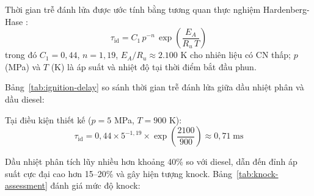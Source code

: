 \documentclass[../main.tex]{subfiles}
\begin{document}
Thời gian trễ đánh lửa được ước tính bằng tương quan thực nghiệm Hardenberg-Hase \cite{Heywood1988}:
\begin{equation}
  \tau_{\text{id}} = C_1 \, p^{-n} \, \exp\!\left(\frac{E_A}{R_u \, T}\right)
  \label{eq:ignition-delay}
\end{equation}
trong đó $C_1 = 0{,}44$, $n = 1{,}19$, $E_A/R_u \approx 2.100$ K cho nhiên liệu có CN thấp; $p$ (MPa) và $T$ (K) là áp suất và nhiệt độ tại thời điểm bắt đầu phun.

Bảng~\ref{tab:ignition-delay} so sánh thời gian trễ đánh lửa giữa dầu nhiệt phân và dầu diesel:
\begin{table}[htbp]
\centering
\caption{So sánh thời gian trễ đánh lửa $\tau_{\text{id}}$ giữa dầu nhiệt phân và dầu diesel}
\label{tab:ignition-delay}
\setlength{\tabcolsep}{4pt}
\end{table}

Tại điều kiện thiết kế ($p = 5$ MPa, $T = 900$ K):
\begin{equation}
  \tau_{\text{id}} = 0{,}44 \times 5^{-1,19} \times \exp\!\left(\frac{2100}{900}\right)
  \approx 0{,}71 \;\text{ms}
\end{equation}

Dầu nhiệt phân tích lũy nhiều hơn khoảng 40\% so với diesel, dẫn đến đỉnh áp suất cực đại cao hơn 15--20\% và gây hiện tượng knock. Bảng~\ref{tab:knock-assessment} đánh giá mức độ knock:
\begin{table}[htbp]
\centering
\caption{Đánh giá mức độ knock của dầu nhiệt phân so với dầu diesel}
\label{tab:knock-assessment}
\setlength{\tabcolsep}{4pt}
\end{table}
\end{document}
